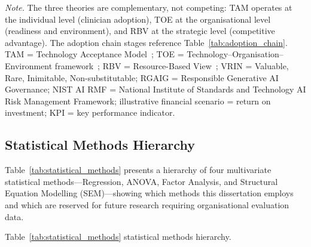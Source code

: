 \vspace{0.5em}
\noindent\textit{Note.} The three theories are complementary, not competing: TAM operates at the individual level (clinician adoption), TOE at the organisational level (readiness and environment), and RBV at the strategic level (competitive advantage). The adoption chain stages reference Table~\ref{tab:adoption_chain}. TAM = Technology Acceptance Model~\cite{davis1989tam}; TOE = Technology--Organisation--Environment framework~\cite{tornatzky1990processes}; RBV = Resource-Based View~\cite{barney1991firm}; VRIN = Valuable, Rare, Inimitable, Non-substitutable; RGAIG = Responsible Generative AI Governance; NIST AI RMF = National Institute of Standards and Technology AI Risk Management Framework; illustrative financial scenario = return on investment; KPI = key performance indicator.

\subsection{Statistical Methods Hierarchy}

Table~\ref{tab:statistical_methods} presents a hierarchy of four multivariate statistical methods---Regression, ANOVA, Factor Analysis, and Structural Equation Modelling (SEM)---showing which methods this dissertation employs and which are reserved for future research requiring organisational evaluation data.


\noindent Table~\ref{tab:statistical_methods} statistical methods hierarchy.

